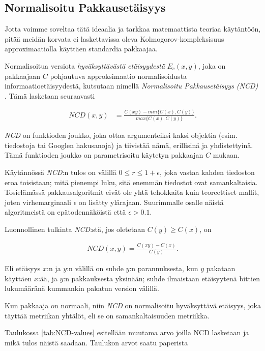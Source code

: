 \documentclass[12pt,finnish]{tktltiki2}
\theoremstyle{definition}
\theoremstyle{remark}
\begin{document}
\subsection{Normalisoitu Pakkausetäisyys} %
\label{sub:normalisoitu_pakkauset_isyys}

  Jotta voimme soveltaa tätä ideaalia ja tarkkaa matemaattista teoriaa käytäntöön, pitää meidän korvata ei laskettavissa oleva Kolmogorov-kompleksisuus approximaatiolla käyttäen standardia pakkaajaa.

  Normalisoitua versiota \emph{hyväksyttävästä etäisyydestä} $E_c(x,y)$, joka on pakkaajaan $C$ pohjautuva approksimaatio normalisoidusta informaatioetäisyydestä, kutsutaan nimellä \emph{Normalisoitu Pakkausetäisyys (NCD)} \cite{CV05}.
  Tämä lasketaan seuraavasti

  \begin{align}
    NCD(x,y) &= \frac{C(xy)-min\{C(x),C(y)\}}{max\{C(x),C(y)\}}.
  \end{align}

  \emph{NCD} on funktioden joukko, joka ottaa argumenteiksi kaksi objektia (esim. tiedostoja tai Googlen hakusanoja) ja tiivistää nämä, erillisinä ja yhdistettyinä.
  Tämä funktioden joukko on parametrisoitu käytetyn pakkaajan $C$ mukaan.

  Käytännössä \emph{NCD}:n tulos on välillä $0 \leq r \leq 1+ \epsilon$, joka vastaa kahden tiedoston eroa toisistaan; mitä pienempi luku, sitä enemmän tiedostot ovat samankaltaisia.
  Tosielämässä pakkausalgoritmit eivät ole yhtä tehokkaita kuin teoreettiset mallit, joten virhemarginaali $\epsilon$ on lisätty ylärajaan.
  Suurimmalle osalle näistä algoritmeistä on epätodennäköistä että  $\epsilon > 0.1$.

  Luonnollinen tulkinta \emph{NCD}:stä, jos oletetaan $C(y) \geq C(x)$, on

  \begin{align}
    NCD(x,y) = \frac{C(xy)-C(x)}{C(y)}.
 \end{align}

  Eli etäisyys $x$:n ja $y$:n välillä on suhde $y$:n parannuksesta, kun $y$ pakataan käyttäen $x$:ää, ja $y$:n pakkauksesta yksinään; suhde ilmaistaan etäisyytenä bittien lukumääränä kummankin pakatun version välillä.

  Kun pakkaaja on normaali, niin \emph{NCD} on normalisoitu hyväksyttävä etäisyys, joka täyttää metriikan yhtälöt, eli se on samankaltaisuuden metriikka.

  Taulukossa \ref{tab:NCD-values} esitellään muutama arvo joilla NCD lasketaan ja mikä tulos näistä saadaan. Taulukon arvot saatu paperista \cite{cebrian2005common}
\end{document}
